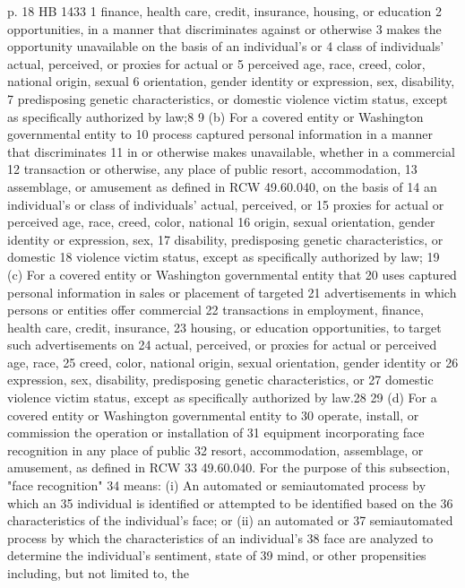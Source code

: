 p. 18 HB 1433
1 finance, health care, credit, insurance, housing, or education
2 opportunities, in a manner that discriminates against or otherwise
3 makes the opportunity unavailable on the basis of an individual's or
4 class of individuals' actual, perceived, or proxies for actual or
5 perceived age, race, creed, color, national origin, sexual
6 orientation, gender identity or expression, sex, disability,
7 predisposing genetic characteristics, or domestic violence victim
status, except as specifically authorized by law;8
9 (b) For a covered entity or Washington governmental entity to
10 process captured personal information in a manner that discriminates
11 in or otherwise makes unavailable, whether in a commercial
12 transaction or otherwise, any place of public resort, accommodation,
13 assemblage, or amusement as defined in RCW 49.60.040, on the basis of
14 an individual's or class of individuals' actual, perceived, or
15 proxies for actual or perceived age, race, creed, color, national
16 origin, sexual orientation, gender identity or expression, sex,
17 disability, predisposing genetic characteristics, or domestic
18 violence victim status, except as specifically authorized by law;
19 (c) For a covered entity or Washington governmental entity that
20 uses captured personal information in sales or placement of targeted
21 advertisements in which persons or entities offer commercial
22 transactions in employment, finance, health care, credit, insurance,
23 housing, or education opportunities, to target such advertisements on
24 actual, perceived, or proxies for actual or perceived age, race,
25 creed, color, national origin, sexual orientation, gender identity or
26 expression, sex, disability, predisposing genetic characteristics, or
27 domestic violence victim status, except as specifically authorized by
law.28
29 (d) For a covered entity or Washington governmental entity to
30 operate, install, or commission the operation or installation of
31 equipment incorporating face recognition in any place of public
32 resort, accommodation, assemblage, or amusement, as defined in RCW
33 49.60.040. For the purpose of this subsection, "face recognition"
34 means: (i) An automated or semiautomated process by which an
35 individual is identified or attempted to be identified based on the
36 characteristics of the individual's face; or (ii) an automated or
37 semiautomated process by which the characteristics of an individual's
38 face are analyzed to determine the individual's sentiment, state of
39 mind, or other propensities including, but not limited to, the
